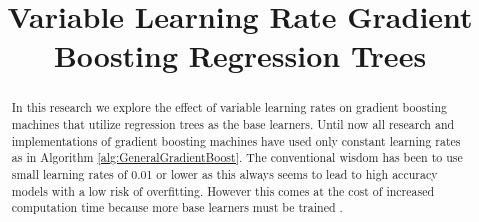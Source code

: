 \documentclass[conference]{IEEEtran}
\begin{document}
%
\title{Variable Learning Rate Gradient Boosting Regression Trees }


\author{
\and
{}
}

\maketitle

\begin{abstract}
In this research we explore the effect of variable learning rates on gradient boosting machines that utilize regression trees as the base learners. Until now all research and implementations of gradient boosting machines have used only constant learning rates as in Algorithm \ref{alg:GeneralGradientBoost}. The conventional wisdom has been to use small learning rates of 0.01 or lower as this always seems to lead to high accuracy models with a low risk of overfitting. However this comes at the cost of increased computation time because more base learners must be trained \cite{2012ridgeway}. 
\end{abstract}





%
\IEEEpeerreviewmaketitle
\end{document}
